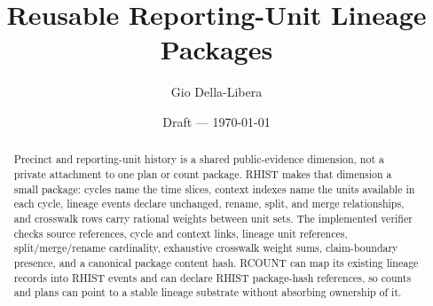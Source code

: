 \documentclass[12pt]{article}
\title{Reusable Reporting-Unit Lineage Packages}
\author{Gio Della-Libera}
\date{Draft --- \today}
\begin{document}
\maketitle

\begin{abstract}
Precinct and reporting-unit history is a shared public-evidence dimension, not
a private attachment to one plan or count package. RHIST makes that dimension a
small package: cycles name the time slices, context indexes name the units
available in each cycle, lineage events declare unchanged, rename, split, and
merge relationships, and crosswalk rows carry rational weights between unit
sets. The implemented verifier checks source references, cycle and context
links, lineage unit references, split/merge/rename cardinality, exhaustive
crosswalk weight sums, claim-boundary presence, and a canonical package content
hash. RCOUNT can map its existing lineage records into RHIST events and can
declare RHIST package-hash references, so counts and plans can point to a
stable lineage substrate without absorbing ownership of it.
\end{abstract}








\nocite{rcount-overview-2026,rctx-context-packages-2026}


\end{document}
